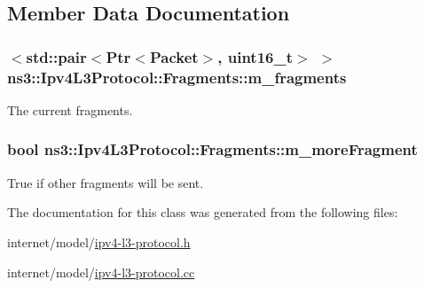 \subsection{Member Data Documentation}
\subsubsection[{\texorpdfstring{m\+\_\+fragments}{m_fragments}}]{$<$std\+::pair$<${\bf Ptr}$<${\bf Packet}$>$, uint16\+\_\+t$>$ $>$ ns3\+::\+Ipv4\+L3\+Protocol\+::\+Fragments\+::m\+\_\+fragments\hspace{0.3cm}{\ttfamily [private]}}\hypertarget{classns3_1_1Ipv4L3Protocol_1_1Fragments_a5647938dd668471f5872839589d104d9}{}\label{classns3_1_1Ipv4L3Protocol_1_1Fragments_a5647938dd668471f5872839589d104d9}


The current fragments. 

\subsubsection[{\texorpdfstring{m\+\_\+more\+Fragment}{m_moreFragment}}]{\setlength{\rightskip}{0pt plus 5cm}bool ns3\+::\+Ipv4\+L3\+Protocol\+::\+Fragments\+::m\+\_\+more\+Fragment\hspace{0.3cm}{\ttfamily [private]}}\hypertarget{classns3_1_1Ipv4L3Protocol_1_1Fragments_a8b4cd61997b516c716d809d2f2f12b51}{}\label{classns3_1_1Ipv4L3Protocol_1_1Fragments_a8b4cd61997b516c716d809d2f2f12b51}


True if other fragments will be sent. 



The documentation for this class was generated from the following files\+:\begin{DoxyCompactItemize}
\item 
internet/model/\hyperlink{ipv4-l3-protocol_8h}{ipv4-\/l3-\/protocol.\+h}\item 
internet/model/\hyperlink{ipv4-l3-protocol_8cc}{ipv4-\/l3-\/protocol.\+cc}\end{DoxyCompactItemize}

